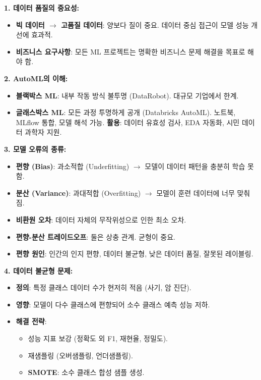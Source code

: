 \documentclass[11pt,a4paper]{article}
\theoremstyle{definition}
\begin{document}
\begin{itemize}
\begin{itemize}
\begin{itemize}
\begin{itemize}
\begin{itemize}
\begin{enumerate}
\begin{tcolorbox}[colback=myblue!20, colframe=blue!75!black, title=\textbf{CSCI103 Lecture 10 핵심 요약}, sharp corners, boxsep=5mm, left=3mm, right=3mm, top=3mm, bottom=3mm]
\textbf{1. 데이터 품질의 중요성:}
\begin{itemize}
    \item \textbf{빅 데이터 $\rightarrow$ 고품질 데이터}: 양보다 질이 중요. 데이터 중심 접근이 모델 성능 개선에 효과적.
    \item \textbf{비즈니스 요구사항}: 모든 ML 프로젝트는 명확한 비즈니스 문제 해결을 목표로 해야 함.
\end{itemize}

\textbf{2. AutoML의 이해:}
\begin{itemize}
    \item \textbf{블랙박스 ML}: 내부 작동 방식 불투명 (DataRobot). 대규모 기업에서 한계.
    \item \textbf{글래스박스 ML}: 모든 과정 투명하게 공개 (Databricks AutoML). 노트북, MLflow 통합, 모델 해석 가능.
    \textbf{활용}: 데이터 유효성 검사, EDA 자동화, 시민 데이터 과학자 지원.
\end{itemize}

\textbf{3. 모델 오류의 종류:}
\begin{itemize}
    \item \textbf{편향 (Bias)}: 과소적합 (Underfitting) $\rightarrow$ 모델이 데이터 패턴을 충분히 학습 못함.
    \item \textbf{분산 (Variance)}: 과대적합 (Overfitting) $\rightarrow$ 모델이 훈련 데이터에 너무 맞춰짐.
    \item \textbf{비환원 오차}: 데이터 자체의 무작위성으로 인한 최소 오차.
    \item \textbf{편향-분산 트레이드오프}: 둘은 상충 관계. 균형이 중요.
    \item \textbf{편향 원인}: 인간의 인지 편향, 데이터 불균형, 낮은 데이터 품질, 잘못된 레이블링.
\end{itemize}

\textbf{4. 데이터 불균형 문제:}
\begin{itemize}
    \item \textbf{정의}: 특정 클래스 데이터 수가 현저히 적음 (사기, 암 진단).
    \item \textbf{영향}: 모델이 다수 클래스에 편향되어 소수 클래스 예측 성능 저하.
    \item \textbf{해결 전략}:
    \begin{itemize}
        \item 성능 지표 보강 (정확도 외 F1, 재현율, 정밀도).
        \item 재샘플링 (오버샘플링, 언더샘플링).
        \item \textbf{SMOTE}: 소수 클래스 합성 샘플 생성.
    \end{itemize}
\end{itemize}


\end{tcolorbox}
\end{enumerate}
\end{itemize}
\end{itemize}
\end{itemize}
\end{itemize}
\end{itemize}
\end{document}
